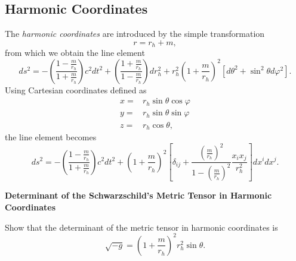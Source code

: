  \subsection{Harmonic Coordinates}
 The \textit{harmonic coordinates} are introduced by the simple transformation
 \begin{equation}\label{eq:HarmonicCoordinatesTransformation}
 r = r_h + m,
 \end{equation} 
from which we obtain the line element
\begin{equation}
ds^2 = -\left( \frac{1-\frac{m}{r_h}}{1+\frac{m}{r_h}}\right) c^2 dt^2 + \left( \frac{1+\frac{m}{r_h}}{1-\frac{m}{r_h}}\right) dr_h^2 + r_h^2 \left( 1 + \frac{m}{r_h} \right)^2 \left[ d\theta^2 + \sin^2 \theta d\varphi^2  \right].\label{eq:SchwHarmonic}
\end{equation}
Using Cartesian coordinates defined as
\begin{subequations}\label{eq:CartesianHarmonicCoordinates}
 \begin{align}
 x = &r_{h} \sin \theta \cos \varphi \\
 y = &r_{h} \sin \theta \sin \varphi \\
 z = &r_{h} \cos \theta , 
 \end{align}
 \end{subequations}
 the line element becomes
  \begin{equation}
 ds^2 = - \left( \frac{1-\frac{m}{r_h}}{1+\frac{m}{r_h}}\right) c^2 dt^2 + \left( 1 + \frac{m}{r_h}\right)^2  \left[ \delta_{ij} + \frac{\left(\frac{m}{r_h}\right)^2}{1-\left(\frac{m}{r_h}\right)^2} \frac{x_i x_j}{r_h^2}  \right] dx^i dx^j .\label{eq:LineElementCartesianHarmonicCoordinates}
 \end{equation}
 

\begin{exercise}
\textbf{Determinant of the Schwarzschild's Metric Tensor in Harmonic Coordinates}

Show that the determinant of the metric tensor in harmonic coordinates is
\begin{equation}
\sqrt{-g} =  \left( 1+ \frac{m}{r_h} \right)^2 r_h^2 \sin \theta.
\end{equation}
\end{exercise}

